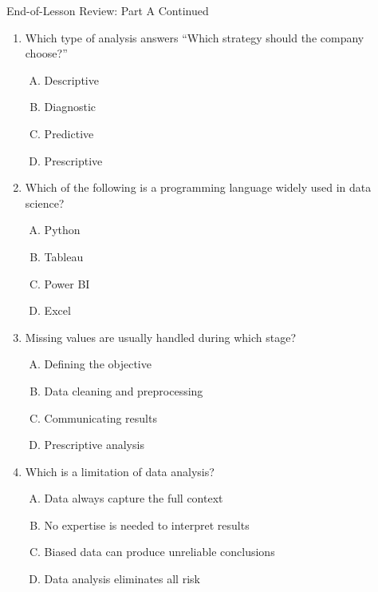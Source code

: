 \documentclass[aspectratio=169,11pt]{beamer}
\begin{document}
\begin{frame}{End-of-Lesson Review: Part A Continued}
\begin{enumerate}\scriptsize\setcounter{enumi}{4}
  \item Which type of analysis answers ``Which strategy should the company choose?''
  \begin{enumerate}[A.]\scriptsize
    \item Descriptive \item Diagnostic \item Predictive \item Prescriptive
  \end{enumerate}
  \item Which of the following is a programming language widely used in data science?
  \begin{enumerate}[A.]\scriptsize
    \item Python \item Tableau \item Power BI \item Excel
  \end{enumerate}
  \item Missing values are usually handled during which stage?
  \begin{enumerate}[A.]\scriptsize
    \item Defining the objective \item Data cleaning and preprocessing \item Communicating results \item Prescriptive analysis
  \end{enumerate}
  \item Which is a limitation of data analysis?
  \begin{enumerate}[A.]\scriptsize
    \item Data always capture the full context
    \item No expertise is needed to interpret results
    \item Biased data can produce unreliable conclusions
    \item Data analysis eliminates all risk
  \end{enumerate}
\end{enumerate}
\end{frame}
\end{document}
